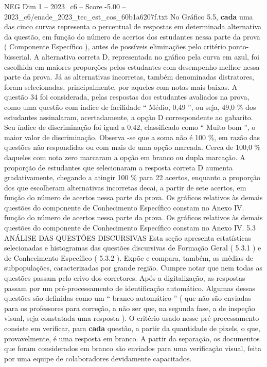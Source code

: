 \begin{textsample}{NEG Dim 1 – 2023\_c6 – Score -5.00 – 2023\_c6/enade\_2023\_tec\_est\_cos\_60b1a6207f.txt}
No Gráfico 5.5, \textbf{cada} uma das cinco curvas representa o percentual de respostas em determinada alternativa da questão, em função do número de acertos dos estudantes nessa parte da prova ( Componente Específico ), antes de possíveis eliminações pelo critério ponto-bisserial.
A alternativa correta D, representada no gráfico pela curva em azul, foi escolhida em maiores proporções pelos estudantes com desempenho melhor nessa parte da prova.
Já as alternativas incorretas, também denominadas distratores, foram selecionadas, principalmente, por aqueles com notas mais baixas.
A questão 34 foi considerada, pelas respostas dos estudantes avaliados na prova, como uma questão com índice de facilidade “ Médio, 0,49 ”, ou seja, 49,0 \% dos estudantes assinalaram, acertadamente, a opção D correspondente ao gabarito.
Seu índice de discriminação foi igual a 0,42, classificado como “ Muito bom ”, o maior valor de discriminação.
Observa -se que a soma não é 100 \%, em razão das questões não respondidas ou com mais de uma opção marcada.
Cerca de 100,0 \% daqueles com nota zero marcaram a opção em branco ou dupla marcação.
A proporção de estudantes que selecionaram a resposta correta D aumenta gradativamente, chegando a atingir 100 \% para 22 acertos, enquanto a proporção dos que escolheram alternativas incorretas decai, a partir de sete acertos, em função do número de acertos nessa parte da prova.
Os gráficos relativos às demais questões do componente de Conhecimento Específico constam no Anexo IV. função do número de acertos nessa parte da prova.
Os gráficos relativos às demais questões do componente de Conhecimento Específico constam no Anexo IV. 5.3 ANÁLISE DAS QUESTÕES DISCURSIVAS Esta seção apresenta estatísticas selecionadas e histogramas das questões discursivas de Formação Geral ( 5.3.1 ) e de Conhecimento Específico ( 5.3.2 ).
Expõe e compara, também, as médias de subpopulações, caracterizadas por grande região.
Cumpre notar que nem todas as questões passam pelo crivo dos corretores.
Após a digitalização, as respostas passam por um pré-processamento de identificação automático.
Algumas dessas questões são definidas como um “ branco automático ” ( que não são enviadas para os professores para correção, a não ser que, na segunda fase, a de inspeção visual, seja constatada uma resposta ).
O critério usado nesse pré-processamento consiste em verificar, para \textbf{cada} questão, a partir da quantidade de pixels, o que, provavelmente, é uma resposta em branco.
A partir da separação, os documentos que foram considerados em branco são enviados para uma verificação visual, feita por uma equipe de colaboradores devidamente capacitados.

\end{textsample}
